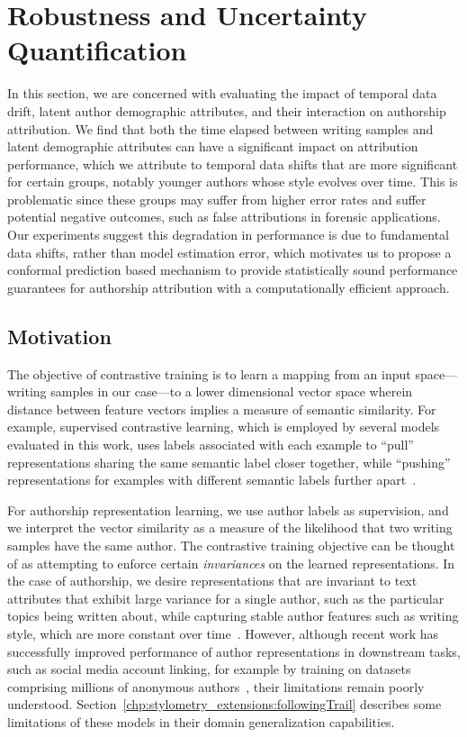 \section{Robustness and Uncertainty Quantification}

In this section, we are concerned with evaluating the impact of temporal data drift, latent author demographic attributes, and their interaction on authorship attribution.
We find that both the time elapsed between writing samples and latent demographic attributes can have a significant impact on attribution performance, which we attribute to temporal data shifts that are more significant for certain groups, notably younger authors whose style evolves over time.
This is problematic since these groups may suffer from higher error rates and suffer potential negative outcomes, such as false attributions in forensic applications.
Our experiments suggest this degradation in performance is due to fundamental data shifts, rather than model estimation error, which motivates us to propose a conformal prediction based mechanism to provide statistically sound performance guarantees for authorship attribution with a computationally efficient approach.

\subsection{Motivation}

The objective of contrastive training is to learn a mapping from an input space---writing samples in our case---to a lower dimensional vector space wherein distance between feature vectors implies a measure of semantic similarity. 
For example, supervised contrastive learning, which is employed by several models evaluated in this work, uses labels associated with each example to ``pull'' representations sharing the same semantic label closer together, while ``pushing'' representations for examples with different semantic labels further apart~\cite{khosla2020supervised}. 

For authorship representation learning, we use author labels as supervision, and we interpret the vector similarity as a measure of the likelihood that two writing samples have the same author. 
The contrastive training objective can be thought of as attempting to enforce certain \emph{invariances} on the learned representations.
In the case of authorship, we desire representations that are invariant to text attributes that exhibit large variance for a single author, such as the particular topics being written about, while capturing stable author features such as writing style, which are more constant over time~\cite{andrews2019learning}.
However, although recent work has successfully improved performance of author representations in downstream tasks, such as social media account linking, for example by training on datasets comprising millions of anonymous authors~\cite{khan2021deep}, their limitations remain poorly understood. 
Section~\ref{chp:stylometry_extensions:followingTrail} describes some limitations of these models in their domain generalization capabilities.

